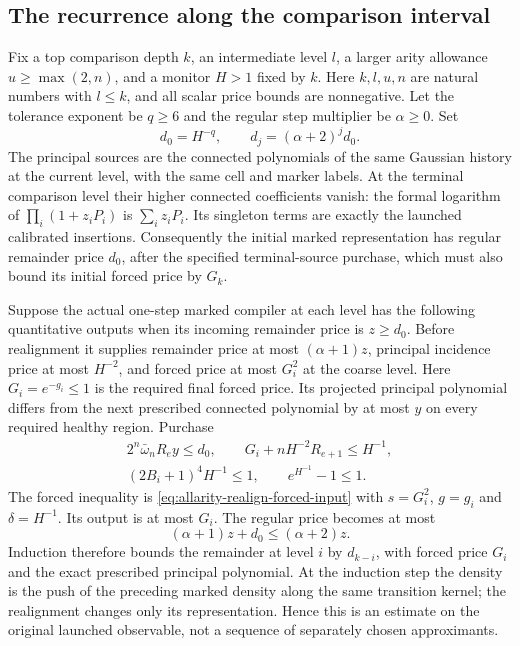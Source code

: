 \subsection{The recurrence along the comparison interval}

Fix a top comparison depth $k$, an intermediate level $l$, a larger
arity allowance $u\ge\max(2,n)$, and a monitor $H>1$ fixed by $k$.
Here $k,l,u,n$ are natural numbers with $l\le k$, and all scalar
price bounds are nonnegative.
Let the tolerance exponent be $q\ge6$ and the regular step multiplier
be $\alpha\ge0$. Set
\[
 d_0=H^{-q},\qquad d_j=(\alpha+2)^j d_0.
\]
The principal sources are the connected polynomials of the same
Gaussian history at the current level, with the same cell and marker
labels. At the terminal comparison level their higher connected
coefficients vanish: the formal logarithm of
$\prod_i(1+z_iP_i)$ is $\sum_i z_iP_i$. Its singleton terms are
exactly the launched calibrated insertions. Consequently the initial
marked representation has regular remainder price $d_0$, after the
specified terminal-source purchase, which must also bound its initial
forced price by $G_k$.

Suppose the actual one-step marked compiler at each level has the
following quantitative outputs when its incoming remainder price is
$z\ge d_0$. Before realignment it supplies remainder price at most
$(\alpha+1)z$, principal incidence price at most $H^{-2}$, and forced
price at most $G_i^2$ at the coarse level. Here
$G_i=e^{-g_i}\le1$ is the required final forced price. Its projected
principal polynomial differs from the next prescribed connected
polynomial by at most $y$ on every required healthy region. Purchase
\begin{gather}
 2^n\bar\omega_nR_e y\le d_0,\qquad
 G_i+n H^{-2}R_{e+1}\le H^{-1},\label{eq:allarity-step-purchases}\\
 (2B_i+1)^4H^{-1}\le1,\qquad e^{H^{-1}}-1\le1.
 \label{eq:allarity-step-small}
\end{gather}
The forced inequality is \eqref{eq:allarity-realign-forced-input}
with $s=G_i^2$, $g=g_i$ and $\delta=H^{-1}$. Its output is at most
$G_i$. The regular price becomes at most
\[
       (\alpha+1)z+d_0\le(\alpha+2)z.
\]
Induction therefore bounds the remainder at level $i$ by $d_{k-i}$,
with forced price $G_i$ and the exact prescribed principal polynomial.
At the induction step the density is the push of the preceding marked
density along the same transition kernel; the realignment changes only
its representation. Hence this is an estimate on the original launched
observable, not a sequence of separately chosen approximants.

